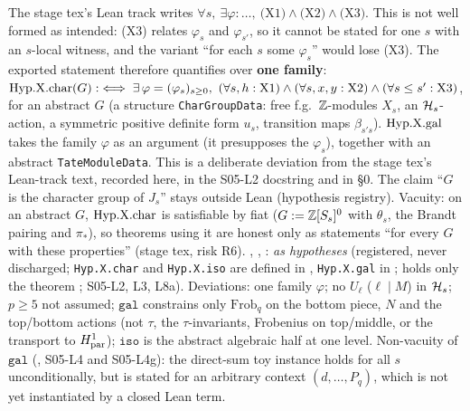 \begin{remark}\label{rem:s05-hypX-lean}
The stage tex's Lean track writes $\forall s,\ \exists\varphi:\dots,\ \text{(X1)}\wedge\text{(X2)}\wedge\text{(X3)}$. This is not well
formed as intended: (X3) relates $\varphi_s$ and $\varphi_{s'}$, so it cannot be stated for one $s$ with an $s$-local witness, and
the variant ``for each $s$ some $\varphi_s$'' would lose (X3). The exported statement therefore quantifies over \textbf{one family}:
$\HypXchar(G):\iff\exists\,\varphi=(\varphi_s)_{s\ge0},\ (\forall s,h:\text{X1})\wedge(\forall s,x,y:\text{X2})\wedge(\forall s\le s':\text{X3})$,
for an abstract $G$ (a structure \texttt{CharGroupData}: free f.g.\ $\mathbb{Z}$-modules $X_s$, an $\mathcal{H}_s$-action, a symmetric positive
definite form $u_s$, transition maps $\beta_{s's}$). $\mathrm{Hyp.X.gal}$ takes the family $\varphi$ as an argument (it presupposes the $\varphi_s$),
together with an abstract \texttt{TateModuleData}. This is a deliberate deviation from the stage tex's Lean-track text, recorded
here, in the S05-L2 docstring and in  \S0. The claim ``$G$ is the character group of $J_s$'' stays outside Lean
(hypothesis registry). Vacuity: on an abstract $G$, $\mathrm{Hyp.X.char}$ is satisfiable by fiat ($G:=\mathbb{Z}[S_s]^0$ with $\theta_s$, the Brandt
pairing and $\pi_*$), so theorems using it are honest only as statements ``for every $G$ with these properties'' (stage tex, risk R6).
, , : \stformal{} \emph{as hypotheses} (registered, never discharged; \texttt{Hyp.X.char} and \texttt{Hyp.X.iso} are defined in , \texttt{Hyp.X.gal} in ;  holds only the theorem ; S05-L2, L3, L8a). Deviations: one family $\varphi$; no $U_\ell$ ($\ell\mid M$) in $\mathcal{H}_s$; $p\ge5$ not assumed; $\mathtt{gal}$ constrains only $\mathrm{Frob}_q$ on the bottom piece, $N$ and the top/bottom actions (not $\tau$, the $\tau$-invariants, Frobenius on top/middle, or the transport to $H^1_{\rm par}$); $\mathtt{iso}$ is the abstract algebraic half at one level. Non-vacuity of $\mathtt{gal}$ (\stformal{}, S05-L4 and S05-L4g): the direct-sum toy instance  holds for all $s$ unconditionally, but is stated for an arbitrary context $(d,\dots,P_q)$, which is not yet instantiated by a closed Lean term.
\end{remark}


